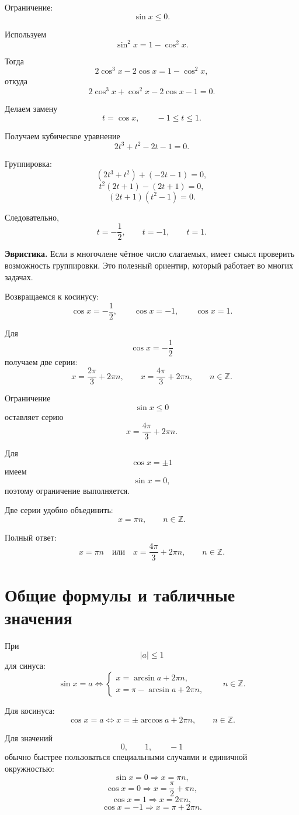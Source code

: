 \documentclass[a4paper,12pt]{article}
\newcommand{\Z}{\mathbb{Z}}
\begin{document}
Ограничение:
\[
\sin x\le0.
\]

Используем
\[
\sin^2x=1-\cos^2x.
\]

Тогда
\[
2\cos^3x-2\cos x
=
1-\cos^2x,
\]
откуда
\[
2\cos^3x+\cos^2x-2\cos x-1=0.
\]

Делаем замену
\[
t=\cos x,
\qquad
-1\le t\le1.
\]

Получаем кубическое уравнение
\[
2t^3+t^2-2t-1=0.
\]

Группировка:
\[
(2t^3+t^2)+(-2t-1)=0,
\]
\[
t^2(2t+1)-(2t+1)=0,
\]
\[
(2t+1)(t^2-1)=0.
\]

Следовательно,
\[
t=-\frac12,
\qquad
t=-1,
\qquad
t=1.
\]

\begin{noteBox}
\textbf{Эвристика.}
Если в многочлене чётное число слагаемых, имеет смысл проверить возможность группировки.
Это полезный ориентир, который работает во многих задачах.
\end{noteBox}

Возвращаемся к косинусу:
\[
\cos x=-\frac12,
\qquad
\cos x=-1,
\qquad
\cos x=1.
\]

Для
\[
\cos x=-\frac12
\]
получаем две серии:
\[
x=\frac{2\pi}{3}+2\pi n,
\qquad
x=\frac{4\pi}{3}+2\pi n,
\qquad
n\in\Z.
\]

Ограничение
\[
\sin x\le0
\]
оставляет серию
\[
x=\frac{4\pi}{3}+2\pi n.
\]

Для
\[
\cos x=\pm1
\]
имеем
\[
\sin x=0,
\]
поэтому ограничение выполняется.

Две серии удобно объединить:
\[
x=\pi n,
\qquad
n\in\Z.
\]

Полный ответ:
\[
\boxed{
x=\pi n
\quad\text{или}\quad
x=\frac{4\pi}{3}+2\pi n,
\qquad
n\in\Z.
}
\]

\section{Общие формулы и табличные значения}

При
\[
|a|\le1
\]
для синуса:
\[
\sin x=a
\iff
\begin{cases}
x=\arcsin a+2\pi n,\\
x=\pi-\arcsin a+2\pi n,
\end{cases}
\qquad
n\in\Z.
\]

Для косинуса:
\[
\cos x=a
\iff
x=\pm\arccos a+2\pi n,
\qquad
n\in\Z.
\]

\begin{keybox}
Для значений
\[
0,\qquad 1,\qquad -1
\]
обычно быстрее пользоваться специальными случаями и единичной окружностью:
\[
\sin x=0
\Rightarrow
x=\pi n,
\]
\[
\cos x=0
\Rightarrow
x=\frac{\pi}{2}+\pi n,
\]
\[
\cos x=1
\Rightarrow
x=2\pi n,
\]
\[
\cos x=-1
\Rightarrow
x=\pi+2\pi n.
\]
\end{keybox}
\end{document}

